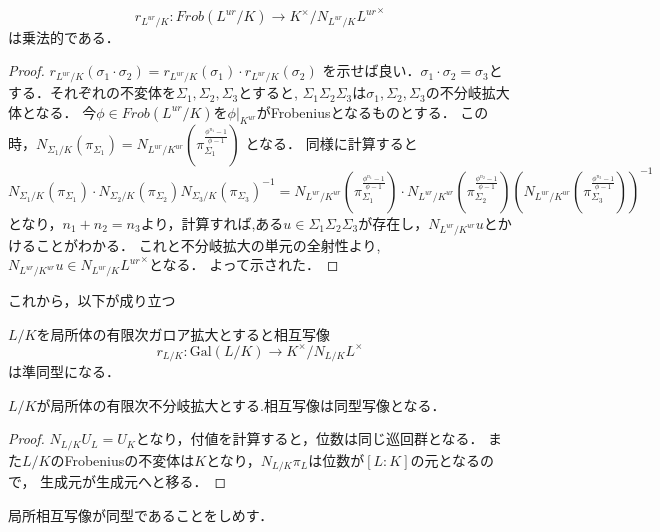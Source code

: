 \documentclass{ujarticle}
\begin{document}
\begin{prop}
 \begin{equation*}
  r_{L^{ur}/K}:Frob( L^{ur}/K ) \to K^{\times}/N_{L^{ur}/K}{L^{ur}}^{\times}
 \end{equation*}
 は乗法的である．
\end{prop}
\begin{proof}
$r_{L^{ur}/K} (\sigma_1 \cdot  \sigma_2) = r_{L^{ur}/K}(\sigma_1) \cdot r_{ L^{ur}/K}(\sigma_2)$
を示せば良い．$\sigma_1 \cdot \sigma_2 =\sigma_3$とする．それぞれの不変体を$\Sigma_1,\Sigma_2,\Sigma_3$とすると,
$\Sigma_1 \Sigma_2 \Sigma_3$は$\sigma_1,\Sigma_2,\Sigma_3$の不分岐拡大体となる．
今$\phi \in Frob(L^{ur}/K)$を$\phi|_{K^{ur}}$がFrobeniusとなるものとする．
この時，$N_{\Sigma_1/K}(\pi_{\Sigma_1}) = N_{L^{ur}/K^{ur}} (\pi_{\Sigma_1}^{\frac{\phi^{n_1}-1}{\phi -1}}) $
となる．
同様に計算すると
\begin{equation*}
  N_{\Sigma_1/K}(\pi_{\Sigma_1})  \cdot N_{\Sigma_2/K}(\pi_{\Sigma_2})  {N_{\Sigma_3/K}(\pi_{\Sigma_3})}^{-1} =
  N_{L^{ur}/K^{ur}} (\pi_{\Sigma_1}^{\frac{\phi^{n_1}-1}{\phi -1}})  \cdot N_{L^{ur}/K^{ur}} (\pi_{\Sigma_2}^{\frac{\phi^{n_2}-1}{\phi -1}})
  (N_{L^{ur}/K^{ur}} (\pi_{\Sigma_3}^{\frac{\phi^{n_3}-1}{\phi -1}}))^{-1}
\end{equation*}
となり，$n_1 + n_2 = n_3$より，計算すれば,ある$u \in \Sigma_1 \Sigma_2 \Sigma_3$が存在し，$N_{L^{ur}/K^{ur}}u$とかけることがわかる．
これと不分岐拡大の単元の全射性より,$N_{L^{ur}/K^{ur}}u \in N_{L^{ur}/K} {L^{ur}}^{\times}$となる．
よって示された．
\end{proof}

これから，以下が成り立つ
\begin{cor}
 $L/K$を局所体の有限次ガロア拡大とすると相互写像
 \begin{equation*}
  r_{L/K}: \mathrm{Gal}(L/K) \to K^{\times}/N_{L/K}L^{\times}
 \end{equation*}
 は準同型になる．
\end{cor}

\begin{cor}
 $L/K$が局所体の有限次不分岐拡大とする.相互写像は同型写像となる．
\end{cor}
\begin{proof}
 $N_{L/K}U_L=U_K$となり，付値を計算すると，位数は同じ巡回群となる．
 また$L/K$のFrobeniusの不変体は$K$となり，$N_{L/K}\pi_L$は位数が$[L:K]$の元となるので，
 生成元が生成元へと移る．
\end{proof}


局所相互写像が同型であることをしめす．
\end{document}
